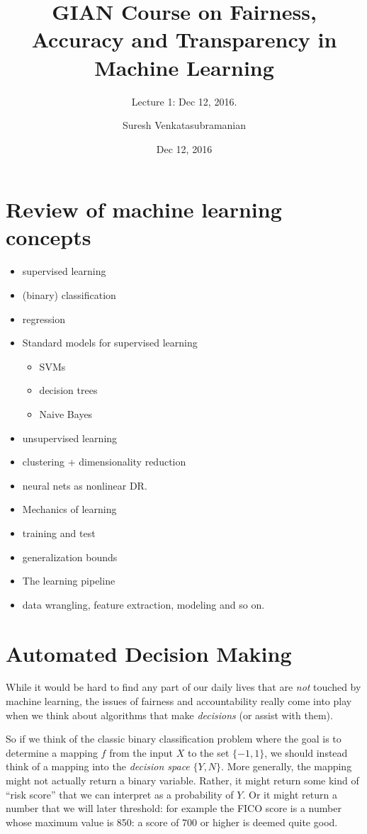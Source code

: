 \documentclass[11pt]{paper}
\title{GIAN Course on Fairness, Accuracy and Transparency in Machine Learning}
\subtitle{Lecture 1: Dec 12, 2016.}
\author{Suresh Venkatasubramanian}
\date{Dec 12, 2016}
\begin{document}
\maketitle

\section{Review of machine learning
concepts}\label{review-of-machine-learning-concepts}

\begin{itemize}
\itemsep1pt\parskip0pt
\item
  supervised learning
\item
  (binary) classification
\item
  regression
\item
  Standard models for supervised learning

  \begin{itemize}
  \itemsep1pt\parskip0pt
  \item
    SVMs
  \item
    decision trees
  \item
    Naive Bayes
  \end{itemize}
\item
  unsupervised learning
\item
  clustering + dimensionality reduction
\item
  neural nets as nonlinear DR.
\item
  Mechanics of learning
\item
  training and test
\item
  generalization bounds
\item
  The learning pipeline
\item
  data wrangling, feature extraction, modeling and so on.
\end{itemize}

\section{Automated Decision Making}\label{automated-decision-making}

While it would be hard to find any part of our daily lives that are
\emph{not} touched by machine learning, the issues of fairness and
accountability really come into play when we think about algorithms that
make \emph{decisions} (or assist with them).

So if we think of the classic binary classification problem where the
goal is to determine a mapping $f $ from the input $X$ to the set
$\{-1, 1\}$, we should instead think of a mapping into the
\emph{decision space} $\{Y, N\}$. More generally, the mapping might not
actually return a binary variable. Rather, it might return some kind of
``risk score'' that we can interpret as a probability of $Y$. Or it
might return a number that we will later threshold: for example the FICO
score is a number whose maximum value is 850: a score of 700 or higher
is deemed quite good.
\end{document}
